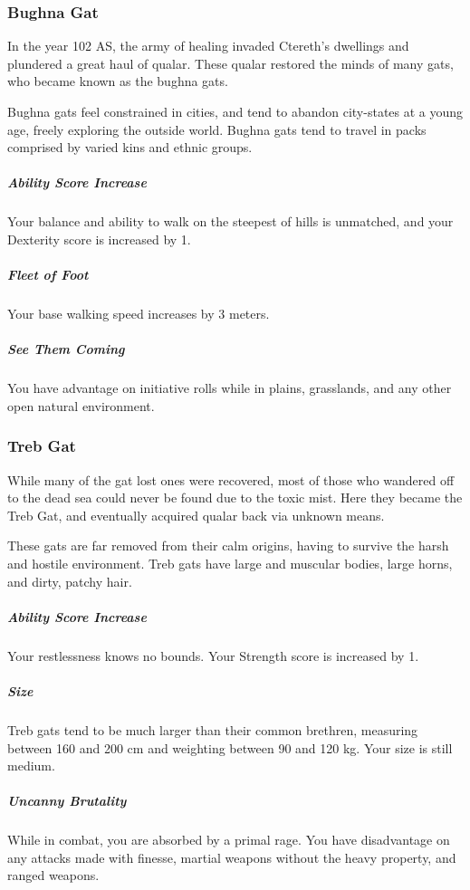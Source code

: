 \subsubsection{Bughna Gat}
In the year 102 AS, the army of healing invaded Ctereth's dwellings and plundered a great haul of qualar.
These qualar restored the minds of many gats, who became known as the bughna gats.

Bughna gats feel constrained in cities, and tend to abandon city-states at a young age, freely exploring the outside world.
Bughna gats tend to travel in packs comprised by varied kins and ethnic groups.

\subparagraph{Ability Score Increase} Your balance and ability to walk on the steepest of hills is unmatched, and your Dexterity score is increased by 1.

\subparagraph{Fleet of Foot} Your base walking speed increases by 3 meters.

\subparagraph{See Them Coming} You have advantage on initiative rolls while in plains, grasslands, and any other open natural environment.

\subsubsection{Treb Gat}
While many of the gat lost ones were recovered, most of those who wandered off to the dead sea could never be found due to the toxic mist.
Here they became the Treb Gat, and eventually acquired qualar back via unknown means.

These gats are far removed from their calm origins, having to survive the harsh and hostile environment.
Treb gats have large and muscular bodies, large horns, and dirty, patchy hair.

\subparagraph{Ability Score Increase} Your restlessness knows no bounds.
Your Strength score is increased by 1.

\subparagraph{Size} Treb gats tend to be much larger than their common brethren, measuring between 160 and 200 cm and weighting between 90 and 120 kg.
Your size is still medium.

\subparagraph{Uncanny Brutality} While in combat, you are absorbed by a primal rage.
You have disadvantage on any attacks made with finesse, martial weapons without the heavy property, and ranged weapons.

